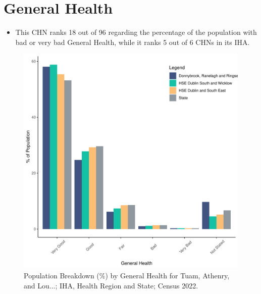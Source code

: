 \documentclass{article}
\begin{document}
\pagebreak

\section{General Health}\label{sect:GenHealth}
\begin{itemize}
\item  This CHN ranks  18 out of 96 regarding the percentage of the population with bad or very bad General Health, while it ranks   5 out of 6 CHNs in its IHA.
\end{itemize}
\begin{figure}[h]
	\centering
	\includegraphics[width = 150mm]{../figures/GenED.pdf}
	\caption{Population Breakdown (\%) by General Health for Tuam, Athenry, and Lou...; IHA, Health Region and State;  Census 2022.}
	\label{fig:2ae19629-1a6a-13a3-e055-000000000001}
	\end{figure}
\end{document}
